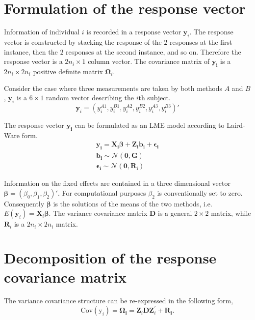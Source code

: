 \documentclass[12pt, a4paper]{report}
\theoremstyle{plain}
\theoremstyle{definition}
\theoremstyle{remark}
\begin{document}
\section{Formulation of the response vector}
Information of individual $i$ is recorded in a response vector $\boldsymbol{y}_{i}$. The response vector is constructed by stacking the response of the $2$ responses at the first instance, then the $2$ responses at the second instance, and so on. Therefore the response vector is a $2n_{i} \times 1$ column vector.
The covariance matrix of $\boldsymbol{y_{i}}$ is a $2n_{i} \times 2n_{i}$ positive definite matrix $\boldsymbol{\Omega}_{i}$.

Consider the case where three measurements are taken by both methods $A$ and $B$, $\boldsymbol{y}_{i}$ is a $6 \times 1$ random vector describing the $i$th subject.
\[
\boldsymbol{y}_{i} = (y_{i}^{A1},y_{i}^{B1},y_{i}^{A2},y_{i}^{B2},y_{i}^{A3},y_{i}^{B3}) \prime
\]

The response vector $\boldsymbol{y_{i}}$ can be formulated as an LME model according to Laird-Ware form.
\begin{eqnarray*}
	\boldsymbol{y_{i}} = \boldsymbol{X_{i}\beta}  + \boldsymbol{Z_{i}b_{i}} + \boldsymbol{\epsilon_{i}}\\
	\boldsymbol{b_{i}} \sim \mathcal{N}(\boldsymbol{0,G})\\
	\boldsymbol{\epsilon_{i}} \sim \mathcal{N}(\boldsymbol{0,R_{i}})
\end{eqnarray*}

Information on the fixed effects are contained in a three dimensional vector $\boldsymbol{\beta} = (\beta_{0},\beta_{1},\beta_{2})\prime$. For computational purposes $\beta_{2}$ is conventionally set to zero. Consequently $\boldsymbol{\beta}$ is the solutions of the means of the two methods, i.e. $E(\boldsymbol{y}_{i})  = \boldsymbol{X}_{i}\boldsymbol{\beta}$. The variance covariance matrix $\boldsymbol{D}$ is a general $2 \times 2$ matrix, while $\boldsymbol{R}_{i}$ is a $2n_{i} \times 2n_{i}$ matrix.

\section{Decomposition of the response covariance matrix}

The variance covariance structure can be re-expressed in the following form,
\[
\mbox{Cov}(\mbox{y}_{i}) = \boldsymbol{\Omega_{i}} = \boldsymbol{Z}_{i}\boldsymbol{D}\boldsymbol{Z}_{i}^\prime + \boldsymbol{R_{i}}.
\]
\end{document}

